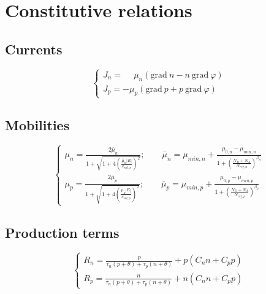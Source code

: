 \documentclass[9pt]{amsart}
\begin{document}
\section{Constitutive relations}

\subsection{Currents}

\begin{equation}\label{eq:currents}
\left\{
\begin{array}{ll}
J_{n} = \phantom{-}\mu_{n} \left( \mathrm{grad}\ n - n\ \mathrm{grad}\ \varphi\right) 
\\[5mm]
J_{p} = -\mu_{p} \left( \mathrm{grad}\ p + p\ \mathrm{grad}\ \varphi\right)  
\end{array}
\right.
\end{equation}

\subsection{Mobilities}

\begin{equation}\label{eq:mobilities}
\left\{
\begin{array}{ll}
\mu_{n} = \displaystyle \frac{2\bar{\mu}_{n}}
{1 + \sqrt{1 + 4 \left( \displaystyle \frac{\bar{\mu}_{n}|E|}{v_{sat,n}}\right)^{2}}}
; \qquad
\bar{\mu}_{n} = \mu_{min, n} + 
\displaystyle \frac{\mu_{0,n} - \mu_{min,n}}
{1 +\displaystyle \left(\frac{N_{D}+N_{A}}{N_{ref,n}}\right)^{\beta_{n}}}
\\[10mm]
\mu_{p} = \displaystyle \frac{2\bar{\mu}_{p}}
{1 + \sqrt{1 + 4 \left( \displaystyle \frac{\bar{\mu}_{p}|E|}{v_{sat,p}}\right)^{2}}}
; \qquad
\bar{\mu}_{p} = \mu_{min, p} + 
\displaystyle \frac{\mu_{0,p} - \mu_{min,p}}
{1 +\displaystyle \left(\frac{N_{D}+N_{A}}{N_{ref,p}}\right)^{\beta_{p}}}
\end{array}
\right.
\end{equation}

\subsection{Production terms}

\begin{equation}\label{eq:recombination}
\left\{
\begin{array}{ll}
R_{n} = \displaystyle 
\frac{p}{\tau_{n} (p + \theta) + \tau_{p} (n + \theta)}
+ p \left(C_{n} n + C_{p} p \right)
\\[5mm]
R_{p} = \displaystyle 
\frac{n}{\tau_{n} (p + \theta) + \tau_{p} (n + \theta)}
+ n \left (C_{n} n + C_{p} p \right)
\end{array}
\right.
\end{equation}
\end{document}
